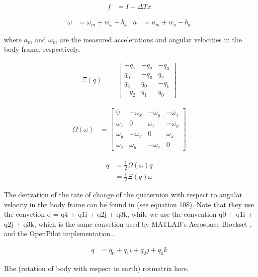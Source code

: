 \documentclass[]{article}
\begin{document}
{\begin{align}
	f &= I + \Delta T \dot{x}
\end{align}

\begin{align}
	\omega &= \omega_m + w_\omega - b_\omega &
	a &= a_m + w_a - b_a
\end{align}

where $a_m$ and $\omega_m$ are the measured accelerations and angular velocities in the body frame, respectively.

\begin{align}
	\Xi(q) &=
	\left[
	\begin{matrix}
		-q_1 	& -q_2	& -q_3 	\\
		q_0		& -q_3 	& q_2 	\\
		q_3 	& q_0 	& -q_1 	\\
		-q_2 	& q_1 	& q_0
	\end{matrix}
	\right]
\end{align}

\begin{align}
	\Omega(\omega) &=
	\left[
	\begin{matrix}
		0 			& -\omega_x 	& -\omega_y	& -\omega_z	\\
		\omega_x 	& 0 			& \omega_z 	& -\omega_y \\
		\omega_y 	& -\omega_z 	& 0 		& \omega_x 	\\
		\omega_z 	& \omega_y		& -\omega_x & 0
	\end{matrix}
	\right]
\end{align}

\begin{align}
	\dot{q} 	&= \frac{1}{2} \Omega(\omega) q \\
				&= \frac{1}{2} \Xi(q) \omega
\end{align}

The derivation of the rate of change of the quaternion with respect to angular velocity in the body frame can be found in \cite{MARSlab} (see equation 108). Note that they use the convetion q = q4 + q1i + q2j + q3k, while we use the convention q0 + q1i + q2j + q3k, which is the same convetion used by MATLAB's Aerospace Blockset \cite{MATLABAerospace}, and the OpenPilot implementation \cite{OpenPilotPaper}.

\begin{align}
	q &= q_0 + q_1i + q_2j + q_3k
\end{align}

Rbe (rotation of body with respect to earth)
rotmatrix here.

}
\end{document}
